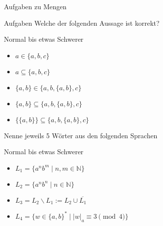 {
\begin{frame}[fragile]{Aufgaben zu Mengen}
    \begin{alertblock}{Aufgaben}
    Welche der folgenden Aussage ist korrekt?
    \end{alertblock}
    \begin{block}{Normal bis etwas Schwerer}
    \begin{minipage}[t]{0.45\textwidth}
            \begin{itemize}
                \item $a \in \{a, b, c\}$
                \item $a \subseteq \{a, b, c\}$
                \item $\{a,b\} \in \{a, b, \{a, b\}, c\}$
            \end{itemize}
    \end{minipage}
    \begin{minipage}[t]{0.45\textwidth}
            \begin{itemize}
                \item $\{a,b\} \subseteq \{a, b, \{a, b\}, c\}$
                \item $\{\{a,b\}\} \subseteq \{a, b, \{a, b\}, c\}$
            \end{itemize}
        \end{minipage}
    \end{block}
    Nenne jeweils 5 Wörter aus den folgenden Sprachen
    \begin{block}{Normal bis etwas Schwerer}
    \begin{itemize}
        \item $L_1 = \{a^nb^m \mid n, m \in \mathbb{N}\}$
        \item $L_2 = \{a^nb^n \mid n \in \mathbb{N}\}$
        \item $L_3 = L_2 \backslash L_1 := L_2 \cup \overline{L_1}$
        \item $L_4 = \{w \in \{a,b\}^* \mid |w|_a \equiv 3 \pmod{4}\}$
    \end{itemize}
    \end{block}
\end{frame}
}

